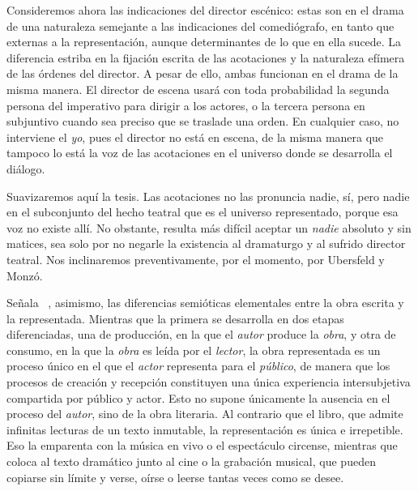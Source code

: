  Consideremos ahora las indicaciones del director escénico: estas son en el drama de una naturaleza semejante a las indicaciones del comediógrafo, en tanto que externas a la representación, aunque determinantes de lo que en ella sucede. La diferencia estriba en la fijación escrita de las acotaciones y la naturaleza efímera de las órdenes del director. A pesar de ello, ambas funcionan en el drama de la misma manera. El director de escena usará con toda probabilidad la segunda persona del imperativo para dirigir a los actores, o la tercera persona en subjuntivo cuando sea preciso que se traslade una orden. En cualquier caso, no interviene el \textit{yo}, pues el director no está en escena, de la misma manera que tampoco lo está la voz de las acotaciones en el universo donde se desarrolla el diálogo. 

Suavizaremos aquí la tesis. Las acotaciones no las pronuncia nadie, sí, pero nadie en el subconjunto del hecho teatral que es el universo representado, porque esa voz no existe allí. No obstante, resulta más difícil aceptar un \textit{nadie} absoluto y sin matices, sea solo por no negarle la existencia al dramaturgo y al sufrido director teatral. Nos inclinaremos preventivamente, por el momento, por Ubersfeld y Monzó.

Señala \citeauthor{garcia2020}~\parencite*[51-56]{garcia2020}, asimismo, las diferencias semióticas elementales entre la obra escrita y la representada. Mientras que la primera se desarrolla en dos etapas diferenciadas, una de producción, en la que el \textit{autor} produce la \textit{obra}, y otra de consumo, en la que la \textit{obra} es leída por el \textit{lector}, la obra representada es un proceso único en el que el \textit{actor} representa para el \textit{público}, de manera que los procesos de creación y recepción constituyen una única experiencia intersubjetiva compartida por público y actor. Esto no supone únicamente la ausencia en el proceso del \textit{autor}, sino de la obra literaria. Al contrario que el libro, que admite infinitas lecturas de un texto inmutable, la representación es única e irrepetible. Eso la emparenta con la música en vivo o el espectáculo circense, mientras que coloca al texto dramático junto al cine o la grabación musical, que pueden copiarse sin límite y verse, oírse o leerse tantas veces como se desee.

